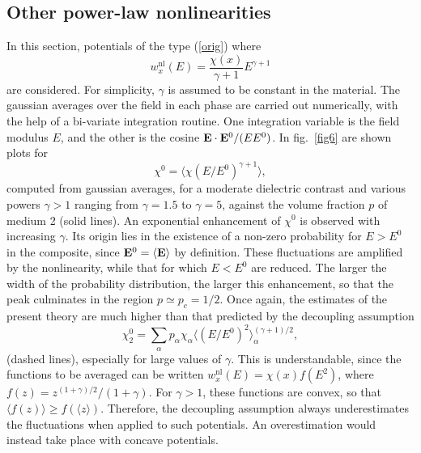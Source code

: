 \subsection{Other power-law nonlinearities}
In this section, potentials of the type (\ref{orig})
where \cite{AHAR87}
\begin{equation}
w^{\text{nl}}_x(E)=\frac{\chi(x)}{\gamma+1}E^{\gamma+1}
\end{equation}
are considered. For simplicity, $\gamma$ is assumed to be
constant in the material. The gaussian averages over the
field in each phase are carried out numerically, with the
help of a bi-variate integration routine. One integration
variable is the field modulus $E$, and the other is the
cosine ${\mathbf E}\cdot{\bf E}^0/(E E^0)$. In fig.\ 
\ref{fig6} are shown plots for
 \begin{equation}
\label{directg}
\chi^0=\langle\chi (E/E^0)^{\gamma+1}\rangle,
\end{equation}
computed from gaussian averages, for a moderate
dielectric contrast and various powers $\gamma>1$
ranging from $\gamma=1.5$ to $\gamma=5$, against
the volume fraction $p$ of medium 2 (solid lines).
An exponential enhancement of $\chi^0$ is observed
with increasing $\gamma$. Its origin lies in the
existence of a non-zero probability for $E>E^0$
in the composite, since ${\bf E}^0=\langle{\bf E}\rangle$
by definition. These fluctuations are amplified by the
nonlinearity, while that for which $E<E^0$ are reduced.
The larger the width of the probability distribution,
the larger this enhancement, so that the peak
culminates in the region $p\simeq p_c=1/2$. Once
again, the estimates of the present theory are much
higher than that predicted by the decoupling assumption
\begin{equation}
\label{decouplg}
\chi^0_2=\sum_\alpha p_\alpha \chi_\alpha \langle(E/E^0)^{2}
\rangle_\alpha^{(\gamma+1)/2},
\end{equation}
(dashed lines), especially for large values of $\gamma$.
This is understandable, since the functions to be averaged can
be written $w_x^{\text{nl}}(E)=\chi(x)f(E^2)$, where
$f(z)=z^{(1+\gamma)/2}/(1+\gamma)$. For $\gamma>1$, these functions
are convex, so that $\langle f(z)\rangle\geq f(\langle z\rangle)$. 
Therefore, the decoupling assumption always underestimates the
fluctuations when applied to such potentials. An overestimation
would instead take place with concave potentials.

